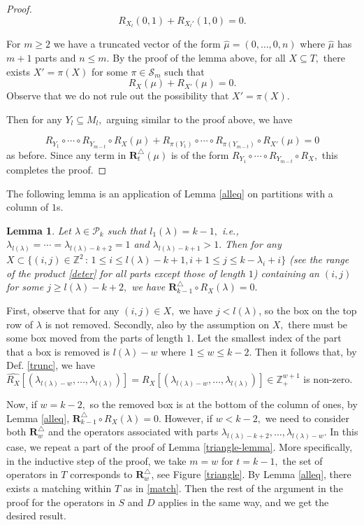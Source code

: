 \documentclass[11pt]{amsart}
\newtheorem{lemma}[theorem]{Lemma}
\newcommand{\pf}{\noindent {\it Proof:} }
\newcommand{\tn}[1]{\textnormal{#1}}
\begin{document}
\begin{proof}
\[R_{X_l}(0,1)  + R_{X_l'}(1,0)=0.\]

\noindent 
For $m\ge 2$ we have a truncated vector of the form
  $ \hat{\mu}=(0,\ldots,0,n)$ where $ \hat{\mu}$ has $m+1$ parts and $n\leq m.$ By the proof of the lemma above, for all $X\subseteq T,$ there exists $X'=\pi(X)$ for some $\pi \in \mathcal{S}_m$ such that
\[R_X( \mu)+ R_{X'}( \mu)=0.\] 
Observe that we do not rule out the possibility that $X'=\pi(X).$ 
  
Then for any $Y_l \subseteq M_l,$ arguing similar to the proof above, we have
 
  \[R_{Y_1} \circ \cdots \circ R_{Y_{m-t}} \circ R_X( \mu)  +R_{\pi(Y_1)} \circ \cdots \circ R_{\pi(Y_{m-t})} \circ R_{X'}( \mu)=0\]
as before. Since any term in $\mathbf{R}_{t}^{\triangle}(\mu)$ is of the form $R_{Y_1} \circ \cdots \circ R_{Y_{m-t}} \circ R_X,$ this completes the proof.
\end{proof}


The following lemma is an application of Lemma \ref{alleq} on partitions with a column of $1$s. 
\begin{lemma} \label{long_col1}
Let $\lambda \in \mathcal{P}_k$ such that $l_1(\lambda)=k-1,$ i.e., $\lambda_{l(\lambda)}=\cdots=\lambda_{l(\lambda)-k+2}=1$ and $\lambda_{l(\lambda)-k+1} >1.$ Then for any $X \subset \{(i,j) \in \mathbb{Z}^2 \, : \, 1 \leq i \leq l(\lambda)-k+1,i+1 \leq j \leq k-\lambda_i+i\}$ \tn{(}see the range of the product \eqref{deter} for all parts except those of length $1$\tn{)} containing an $(i,j)$ for some $j\geq l(\lambda)-k+2,$ we have $\mathbf{R}_{k-1}^{\triangle} \circ R_X(\lambda)=0.$ 
\end{lemma}
\pf First, observe that for any $(i,j) \in X,$ we have $j < l(\lambda)$, so the box on the top row of $\lambda$ is not removed. Secondly, also by the assumption on $X,$ there must be some box moved from the parts of length $1$. Let the smallest index of the part that a box is removed is $l(\lambda)-w$ where $1\leq w \leq k-2.$ Then it follows that, by Def. \eqref{trunc}, we have $\hat{R_X}[(\lambda_{l(\lambda)-w},\ldots,\lambda_{l(\lambda)})]=R_X[(\lambda_{l(\lambda)-w},\ldots,\lambda_{l(\lambda)})] \in \mathbb{Z}_{+}^{w+1}$ is non-zero. 

Now, if $w=k-2,$ so the removed box is at the bottom of the column of ones, by Lemma \ref{alleq}, $\mathbf{R}_{k-1}^{\triangle} \circ R_X(\lambda)=0.$ However, if $w<k-2,$ we need to consider both $\mathbf{R}_{w}^{\triangle}$ and the operators associated with parts $\lambda_{l(\lambda)-k+2},\ldots,\lambda_{l(\lambda)-w}.$ In this case, we repeat a part of the proof of Lemma \ref{triangle-lemma}. More specifically, in the inductive step of the proof, we take $m=w$ for $t=k-1,$ the set of operators in $T$ corresponds to $\mathbf{R}_{w}^{\triangle}$, see Figure \ref{triangle}. 
By Lemma \ref{alleq}, there exists a matching within $T$ as in \eqref{match}. Then the rest of the argument in the proof for the operators in $S$ and $D$ applies in the same way, and we get the desired result.
\end{document}
